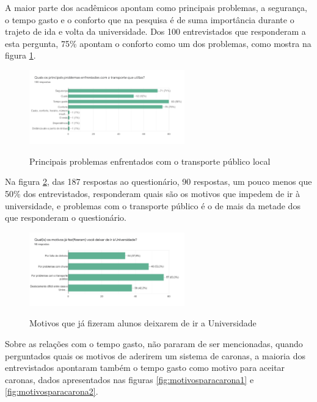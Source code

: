 A maior parte dos acadêmicos apontam como principais problemas, a segurança, o tempo gasto e o conforto que na pesquisa é de suma importância durante o trajeto de ida e volta da universidade. Dos 100 entrevistados que responderam a esta pergunta, 75\% apontam o conforto como um dos problemas, como mostra na figura \ref{fig:problemasenfrentadosparair}.

\begin{figure}[!hbtp]
	\centering
	\caption{Principais problemas enfrentados com o transporte público local}
	\includegraphics[width=0.6\textwidth]{./04-figuras/questionario/11.png}
	\label{fig:problemasenfrentadosparair}
\end{figure}


Na figura \ref{fig:motivos-nao-ir-a-unifao}, das 187 respostas ao questionário, 90 respostas, um pouco menos que 50\% dos entrevistados, responderam quais são os motivos que impedem de ir à universidade, e problemas com o transporte público é o de mais da metade dos que responderam o questionário.

\begin{figure}[!hbtp]
	\centering
	\caption{Motivos que já fizeram alunos deixarem de ir a Universidade}
	\includegraphics[width=0.6\textwidth]{./04-figuras/questionario/12.png}
	\label{fig:motivos-nao-ir-a-unifao}
\end{figure}

Sobre as relações com o tempo gasto, não pararam de ser mencionadas, quando perguntados quais os motivos de aderirem um sistema de caronas, a maioria dos entrevistados apontaram também o tempo gasto como motivo para aceitar caronas, dados apresentados nas figuras \ref{fig:motivosparacarona1} e \ref{fig:motivosparacarona2}.

